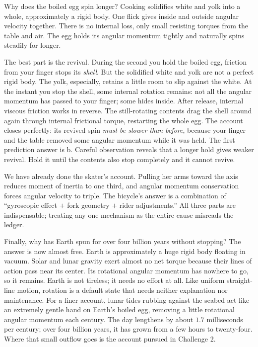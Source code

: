 Why does the boiled egg spin longer? Cooking solidifies white and yolk into a whole, approximately a rigid body. One flick gives inside and outside angular velocity together. There is no internal loss, only small resisting torques from the table and air. The egg holds its angular momentum tightly and naturally spins steadily for longer.

The best part is the revival. During the second you hold the boiled egg, friction from your finger stops its \emph{shell}. But the solidified white and yolk are not a perfect rigid body. The yolk, especially, retains a little room to slip against the white. At the instant you stop the shell, some internal rotation remains: not all the angular momentum has passed to your finger; some hides inside. After release, internal viscous friction works in reverse. The still-rotating contents drag the shell around again through internal frictional torque, restarting the whole egg. The account closes perfectly: its revived spin \emph{must be slower than before}, because your finger and the table removed some angular momentum while it was held. The first prediction answer is b. Careful observation reveals that a longer hold gives weaker revival. Hold it until the contents also stop completely and it cannot revive.

We have already done the skater's account. Pulling her arms toward the axis reduces moment of inertia to one third, and angular momentum conservation forces angular velocity to triple. The bicycle's answer is a combination of ``gyroscopic effect \(+\) fork geometry \(+\) rider adjustments.'' All three parts are indispensable; treating any one mechanism as the entire cause misreads the ledger.

Finally, why has Earth spun for over four billion years without stopping? The answer is now almost free. Earth is approximately a huge rigid body floating in vacuum. Solar and lunar gravity exert almost no net torque because their lines of action pass near its center. Its rotational angular momentum has nowhere to go, so it remains. Earth is not tireless; it needs no effort at all. Like uniform straight-line motion, rotation is a default state that needs neither explanation nor maintenance. For a finer account, lunar tides rubbing against the seabed act like an extremely gentle hand on Earth's boiled egg, removing a little rotational angular momentum each century. The day lengthens by about \(1.7\) milliseconds per century; over four billion years, it has grown from a few hours to twenty-four. Where that small outflow goes is the account pursued in Challenge 2.

